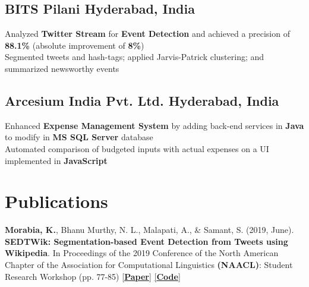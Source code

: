 \documentclass[]{Keval-resume}
\begin{document}
\subsection{BITS Pilani \hfill \normalfont H\lowercase{yderabad}, I\lowercase{ndia}}
\textbullet{} Analyzed \textbf{Twitter Stream} for \textbf{Event Detection} and achieved a precision of \textbf{88.1\%} (absolute improvement of \textbf{8\%}) \\
\textbullet{} Segmented tweets and hash-tags; applied Jarvis-Patrick clustering; and summarized newsworthy events \\
\sectionsep

\subsection{Arcesium India Pvt. Ltd. \hfill \normalfont H\lowercase{yderabad}, I\lowercase{ndia}}
\textbullet{} Enhanced \textbf{Expense Management System} by adding back-end services in \textbf{Java} to modify in \textbf{MS SQL Server} database \\
\textbullet{} Automated comparison of budgeted inputs with actual expenses on a UI implemented in \textbf{JavaScript} \\
\sectionsep


\section{Publications} 
\hrulefill
\postsectionsep 

\textbf{Morabia, K.}, Bhanu Murthy, N. L., Malapati, A., \& Samant, S. (2019, June). \textbf{SEDTWik: Segmentation-based Event Detection from Tweets using Wikipedia}. In Proceedings of the 2019 Conference of the North American Chapter of the Association for Computational Linguistics \textbf{(NAACL)}: Student Research Workshop (pp. 77-85) \href{https://www.aclweb.org/anthology/N19-3011/}{[\textbf{Paper}]} \href{https://github.com/kevalmorabia97/SEDTWik-Event-Detection-from-Tweets}{[\textbf{Code}]}
\sectionsep
\end{document}

